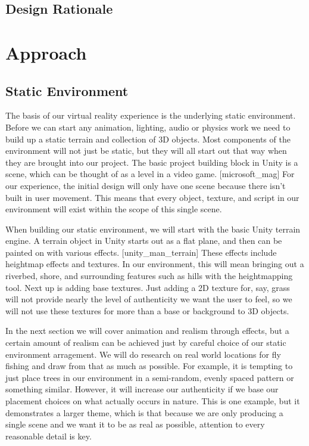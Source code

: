 \documentclass[10pt,journal,compsoc,onecolumn, draftclsnofoot]{IEEEtran}
\begin{document}
\subsection{Design Rationale}



\section{Approach}
\subsection{Static Environment}
The basis of our virtual reality experience is the underlying static
environment. Before we can start any animation, lighting, audio or physics
work we need to build up a static terrain and collection of 3D objects.
Most components of the environment will not just be static, but they will all
start out that way when they are brought into our project. The basic project
building block in Unity is a scene, which can be thought of as a level in a
video game. [microsoft\_mag] For our experience, the initial design will
only have one scene because there isn't built in user movement. This means that
every object, texture, and script in our environment will exist within the
scope of this single scene.

When building our static environment, we will start with the basic Unity
terrain engine. A terrain object in Unity starts out as a flat plane, and then
can be painted on with various effects. [unity\_man\_terrain] These effects
include heightmap effects and textures. In our environment, this will mean
bringing out a riverbed, shore, and surrounding features such as hills with the
heightmapping tool. Next up is adding base textures. Just adding a 2D texture
for, say, grass will not provide nearly the level of authenticity we want the
user to feel, so we will not use these textures for more than a base or
background to 3D objects.

In the next section we will cover animation and realism through effects, but
a certain amount of realism can be achieved just by careful choice of our
static environment arragement. We will do research on real world locations for
fly fishing and draw from that as much as possible. For example, it is tempting
to just place trees in our environment in a semi-random, evenly spaced pattern
or something similar. However, it will increase our authenticity if we base our
placement choices on what actually occurs in nature. This is one example, but
it demonstrates a larger theme, which is that because we are only producing a
single scene and we want it to be as real as possible, attention to every
reasonable detail is key.
\end{document}
